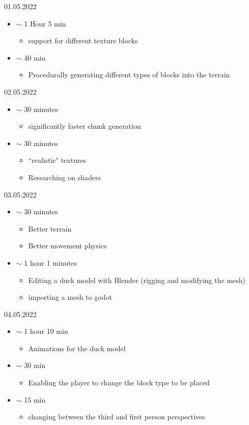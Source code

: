 \documentclass{article}
\begin{document}
01.05.2022
\begin{itemize}
	\item $\sim$ 1 Hour 5 min
	\begin{itemize}
		\item support for different texture blocks
	\end{itemize}
\item $\sim$ 40 min
\begin{itemize}
	\item Procedurally generating different types of blocks into the terrain
\end{itemize}
\end{itemize}

02.05.2022
\begin{itemize}
	\item $\sim$ 30 minutes
	\begin{itemize}
		\item significantly faster chunk generation
	\end{itemize}
	\item $\sim$ 30 minutes
	\begin{itemize}
		\item ``realistic" textures
		\item Researching on shaders
	\end{itemize}
\end{itemize}

03.05.2022
\begin{itemize}
	\item $\sim$ 30 minutes
	\begin{itemize}
		\item Better terrain
		\item Better movement physics
	\end{itemize}
\item $\sim$ 1 hour 1 minutes
\begin{itemize}
	\item Editing a duck model with Blender (rigging and modifying the mesh)
	\item importing a mesh to godot
\end{itemize}
\end{itemize}

04.05.2022
\begin{itemize}
	\item $\sim$ 1 hour 10 min
	\begin{itemize}
		\item Animations for the duck model
	\end{itemize}
\item $\sim$ 30 min
\begin{itemize}
	\item Enabling the player to change the block type to be placed
\end{itemize}
\item $\sim$ 15 min
\begin{itemize}
	\item changing between the third and first person perspectives
\end{itemize}
\end{itemize}
\end{document}
